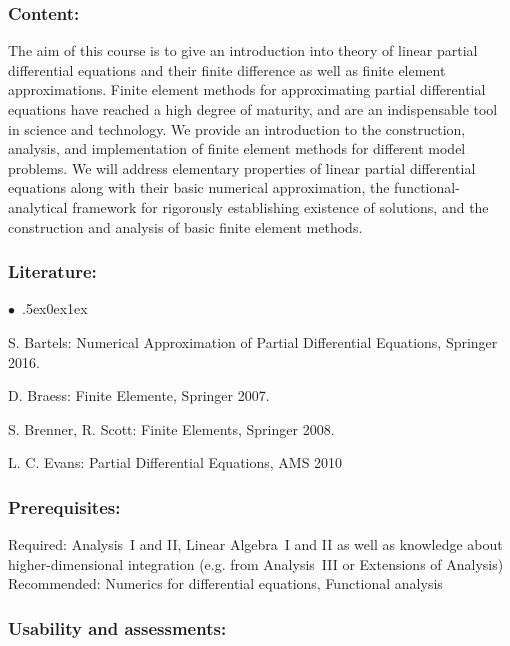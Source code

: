 \documentclass[a4paper,10pt]{article}
\renewenvironment{itemize}{\begin{list}{$\bullet$\ }{\itemsep.5ex\setlength{\topsep}{0.5\itemsep}\parsep0ex\labelsep1ex\settowidth{\labelwidth}{$\bullet$\ }\setlength{\leftmargin}{\labelwidth}\addtolength{\leftmargin}{3ex}\addtolength{\leftmargin}{\labelsep}}}{\end{list}}
\begin{document}
\subsubsection*{\large
    Content:
}
The aim of this course is to give an introduction into theory of linear partial differential equations and their finite difference as well as finite element approximations. Finite element methods for approximating partial differential equations have reached a high degree of maturity, and are an indispensable tool in science and technology. We provide an introduction to the construction, analysis, and implementation of finite element methods for different model problems. We will address elementary properties of linear partial differential equations along with their basic numerical approximation, the functional-analytical framework for rigorously establishing existence of solutions, and the construction and analysis of basic finite element methods.
\subsubsection*{\large
    Literature:
}
\begin{itemize}
\item  S. Bartels: Numerical Approximation of Partial Differential Equations, Springer 2016. 
\item  D. Braess: Finite Elemente, Springer 2007. 
\item  S. Brenner, R. Scott: Finite Elements, Springer 2008. 
\item  L. C. Evans: Partial Differential Equations, AMS 2010
\end{itemize}
\subsubsection*{\large
    Prerequisites:
}
Required: Analysis~I and II, Linear Algebra~I and II as well as knowledge about higher-dimensional integration (e.g. from Analysis~III or Extensions of Analysis) \\
Recommended:  Numerics for differential equations, Functional analysis
\cleardoublepage
\subsubsection*{\large
    Usability and assessments:
}
\end{document}
